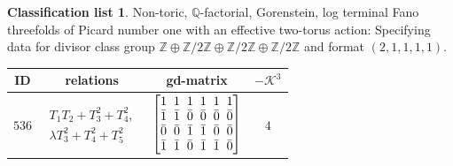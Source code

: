 \documentclass[10pt,a4paper]{amsart}
\theoremstyle{definition}
\newtheorem{class-list}[thm]{Classification list}
\def\ZZ{{\mathbb Z}}
\def\QQ{{\mathbb Q}}
\numberwithin{equation}{section}
\begin{document}
\begin{class-list}
Non-toric, $\QQ$-factorial, Gorenstein, log terminal Fano
threefolds of Picard number one with an effective two-torus action:
Specifying data for divisor class group
$\ZZ\oplus \ZZ/2\ZZ\oplus \ZZ/2\ZZ\oplus \ZZ/2\ZZ$ and format $(2,1,1,1,1)$.
\begin{table}[h!]\centering\setlength{\tabcolsep}{5.5pt}
\renewcommand{\arraystretch}{1.1}\small\tabulinesep=1mm
\begin{tabu}{c|c|c|c}
\hline
ID&relations&gd-matrix&$-\mathcal{K}^3$
\\
\hline
${536}$&
$\begin{array}{r}{T_{1}T_{2}+T_{3}^{2}+T_{4}^{2}},\\ {\lambda T_{3}^{2}+T_{4}^{2}+T_{5}^{2}}\end{array}$
&$\arraycolsep=1mm\begin{bmatrix}{1} & {1} & {1} & {1} & {1} & {1} \\ {\bar{1}} & {\bar{1}} & {\bar{0}} & {\bar{0}} & {\bar{0}} & {\bar{0}} \\ {\bar{0}} & {\bar{0}} & {\bar{1}} & {\bar{1}} & {\bar{0}} & {\bar{0}} \\ {\bar{1}} & {\bar{1}} & {\bar{0}} & {\bar{1}} & {\bar{1}} & {\bar{0}}\end{bmatrix}$
&${4}$
\\
\hline
\end{tabu}\vspace{-2mm}
\end{table}
\end{class-list}
\end{document}
